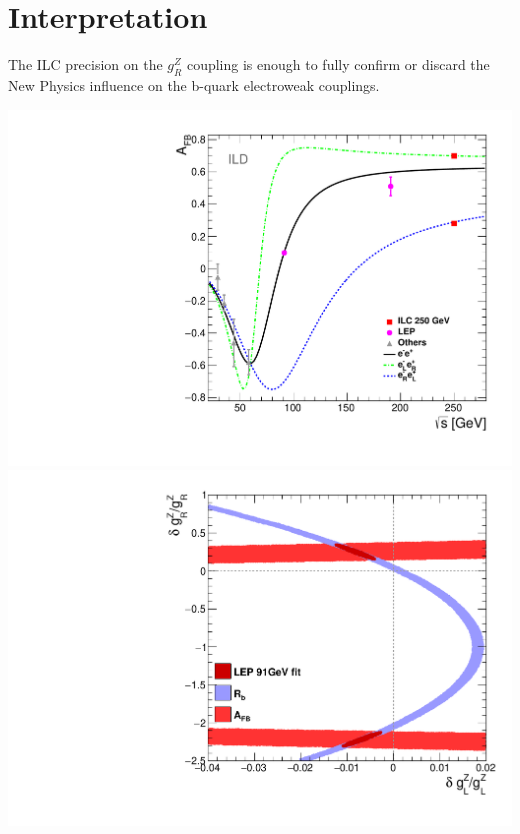 

\section*{Interpretation}

The ILC precision on the $g_R^Z$ coupling is enough to fully confirm or discard the New Physics influence on the b-quark electroweak couplings. 
\begin{center}\vspace{0.5cm}
	
	\includegraphics[width=0.4\linewidth]{plots/afb-sqrts.pdf}
	\includegraphics[width=0.4\linewidth]{../ILD/plots/lep-result-full.pdf}\\


\end{center}
